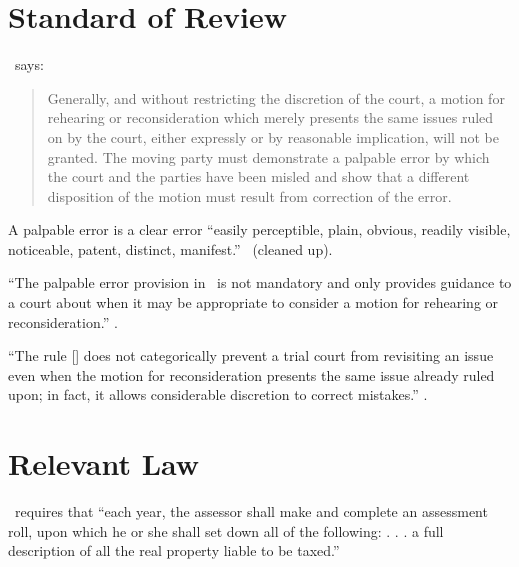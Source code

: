 \documentclass[12pt,\documentclassflag]{michiganCourtOfAppealsBrief}
\begin{document}


\section{Standard of Review}

\cite{MCR 2.119(F)(3)}\ says:

\begin{quote}
  Generally, and without restricting the discretion of the court, a motion for rehearing or reconsideration which merely presents the same issues ruled on by the court, either expressly or by reasonable implication, will not be granted. The moving party must demonstrate a palpable error by which the court and the parties have been misled and show that a different disposition of the motion must result from correction of the error.
\end{quote}

 A palpable error is a clear error ``easily perceptible, plain, obvious, readily
 visible, noticeable, patent, distinct, manifest.'' \ (cleaned up).
 
``The palpable error provision in \cite{MCR 2.119(F)(3)}\ is not mandatory and only provides guidance to
a court about when it may be appropriate to consider a motion for rehearing or reconsideration.''
.

``The rule [\cite{MCR 2.119(F)(3)}] does not categorically prevent a trial court from revisiting an issue even when the motion for reconsideration presents the same issue already ruled upon; in fact, it allows considerable discretion to correct mistakes.'' . 

\section{Relevant Law}

\cite{MCL 211.24(1)}\ requires that ``each year, the assessor shall make and complete an assessment roll, upon which he or she shall set down all of the following: . . . a full description of all the real property liable to be taxed.''
\end{document}
